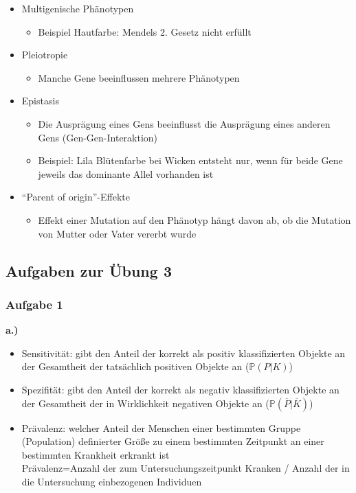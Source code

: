 \begin{itemize}
    \item Multigenische Phänotypen
        \begin{itemize}
            \item Beispiel Hautfarbe: Mendels 2. Gesetz nicht erfüllt
        \end{itemize}
    \item Pleiotropie
        \begin{itemize}
            \item Manche Gene beeinflussen mehrere Phänotypen
        \end{itemize}
    \item Epistasis
        \begin{itemize}
            \item Die Ausprägung eines Gens beeinflusst die Ausprägung eines anderen Gens (Gen-Gen-Interaktion)
            \item Beispiel: Lila Blütenfarbe bei Wicken entsteht nur, wenn für beide Gene jeweils das dominante Allel vorhanden ist
        \end{itemize}
    \item ``Parent of origin''-Effekte
        \begin{itemize}
            \item Effekt einer Mutation auf den Phänotyp hängt davon ab, ob die Mutation von Mutter oder Vater vererbt wurde
        \end{itemize}
\end{itemize}

\subsection{Aufgaben zur Übung 3}
\subsubsection{Aufgabe 1}
\textbf{a.)}
\begin{itemize}
	\item Sensitivität: gibt den Anteil der korrekt als positiv klassifizierten Objekte an der Gesamtheit der tatsächlich positiven Objekte an ($\mathbb{P}(P|K)$)
	\item Spezifität: gibt den Anteil der korrekt als negativ klassifizierten Objekte an der Gesamtheit der in Wirklichkeit negativen Objekte an ($\mathbb{P}(\overline{P}|\overline{K})$)
	\item Prävalenz: welcher Anteil der Menschen einer bestimmten Gruppe (Population) definierter Größe zu einem bestimmten Zeitpunkt an einer bestimmten Krankheit erkrankt ist\\
	Prävalenz=Anzahl der zum Untersuchungszeitpunkt Kranken / Anzahl der in die Untersuchung einbezogenen Individuen
\end{itemize}

